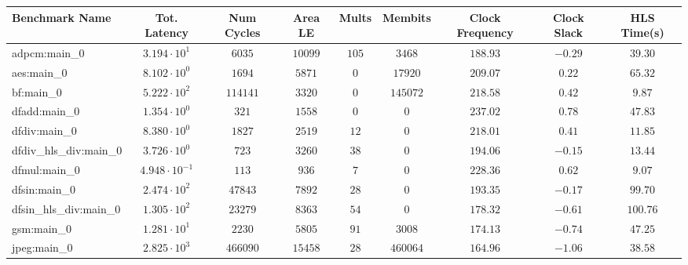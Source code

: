 \begin{tabular}{|l|c|c|c|c|c|c|c|c|}
\hline
Benchmark Name          & Tot. Latency            & Num Cycles & Area LE   & Mults   & Membits    & Clock Frequency & Clock Slack & HLS Time(s) \\
\hline
adpcm:main\_0           & $ 3.194 \cdot 10^{1}  $ & $ 6035   $ & $ 10099 $ & $ 105 $ & $ 3468   $ & $ 188.93      $ & $ -0.29   $ & $ 39.30   $ \\
aes:main\_0             & $ 8.102 \cdot 10^{0}  $ & $ 1694   $ & $ 5871  $ & $ 0   $ & $ 17920  $ & $ 209.07      $ & $ 0.22    $ & $ 65.32   $ \\
bf:main\_0              & $ 5.222 \cdot 10^{2}  $ & $ 114141 $ & $ 3320  $ & $ 0   $ & $ 145072 $ & $ 218.58      $ & $ 0.42    $ & $ 9.87    $ \\
dfadd:main\_0           & $ 1.354 \cdot 10^{0}  $ & $ 321    $ & $ 1558  $ & $ 0   $ & $ 0      $ & $ 237.02      $ & $ 0.78    $ & $ 47.83   $ \\
dfdiv:main\_0           & $ 8.380 \cdot 10^{0}  $ & $ 1827   $ & $ 2519  $ & $ 12  $ & $ 0      $ & $ 218.01      $ & $ 0.41    $ & $ 11.85   $ \\
dfdiv\_hls\_div:main\_0 & $ 3.726 \cdot 10^{0}  $ & $ 723    $ & $ 3260  $ & $ 38  $ & $ 0      $ & $ 194.06      $ & $ -0.15   $ & $ 13.44   $ \\
dfmul:main\_0           & $ 4.948 \cdot 10^{-1} $ & $ 113    $ & $ 936   $ & $ 7   $ & $ 0      $ & $ 228.36      $ & $ 0.62    $ & $ 9.07    $ \\
dfsin:main\_0           & $ 2.474 \cdot 10^{2}  $ & $ 47843  $ & $ 7892  $ & $ 28  $ & $ 0      $ & $ 193.35      $ & $ -0.17   $ & $ 99.70   $ \\
dfsin\_hls\_div:main\_0 & $ 1.305 \cdot 10^{2}  $ & $ 23279  $ & $ 8363  $ & $ 54  $ & $ 0      $ & $ 178.32      $ & $ -0.61   $ & $ 100.76  $ \\
gsm:main\_0             & $ 1.281 \cdot 10^{1}  $ & $ 2230   $ & $ 5805  $ & $ 91  $ & $ 3008   $ & $ 174.13      $ & $ -0.74   $ & $ 47.25   $ \\
jpeg:main\_0            & $ 2.825 \cdot 10^{3}  $ & $ 466090 $ & $ 15458 $ & $ 28  $ & $ 460064 $ & $ 164.96      $ & $ -1.06   $ & $ 38.58   $ \\

\end{tabular}
